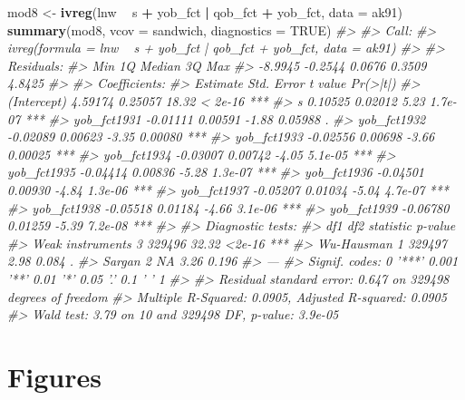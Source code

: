 \documentclass[]{book}
\newenvironment{Shaded}{\begin{snugshade}}{\end{snugshade}}
\newcommand{\KeywordTok}[1]{\textcolor[rgb]{0.13,0.29,0.53}{\textbf{#1}}}
\newcommand{\DataTypeTok}[1]{\textcolor[rgb]{0.13,0.29,0.53}{#1}}
\newcommand{\StringTok}[1]{\textcolor[rgb]{0.31,0.60,0.02}{#1}}
\newcommand{\CommentTok}[1]{\textcolor[rgb]{0.56,0.35,0.01}{\textit{#1}}}
\newcommand{\OtherTok}[1]{\textcolor[rgb]{0.56,0.35,0.01}{#1}}
\newcommand{\OperatorTok}[1]{\textcolor[rgb]{0.81,0.36,0.00}{\textbf{#1}}}
\newcommand{\NormalTok}[1]{#1}
\theoremstyle{definition}
\theoremstyle{definition}
\theoremstyle{definition}
\theoremstyle{remark}
\begin{document}
\begin{Shaded}
\begin{Highlighting}[]
\NormalTok{mod8 <-}\StringTok{ }\KeywordTok{ivreg}\NormalTok{(lnw }\OperatorTok{~}\StringTok{ }\NormalTok{s }\OperatorTok{+}\StringTok{ }\NormalTok{yob_fct }\OperatorTok{|}\StringTok{ }\NormalTok{qob_fct }\OperatorTok{+}\StringTok{ }\NormalTok{yob_fct, }\DataTypeTok{data =}\NormalTok{ ak91)}
\KeywordTok{summary}\NormalTok{(mod8, }\DataTypeTok{vcov =}\NormalTok{ sandwich, }\DataTypeTok{diagnostics =} \OtherTok{TRUE}\NormalTok{)}
\CommentTok{#> }
\CommentTok{#> Call:}
\CommentTok{#> ivreg(formula = lnw ~ s + yob_fct | qob_fct + yob_fct, data = ak91)}
\CommentTok{#> }
\CommentTok{#> Residuals:}
\CommentTok{#>     Min      1Q  Median      3Q     Max }
\CommentTok{#> -8.9945 -0.2544  0.0676  0.3509  4.8425 }
\CommentTok{#> }
\CommentTok{#> Coefficients:}
\CommentTok{#>             Estimate Std. Error t value Pr(>|t|)    }
\CommentTok{#> (Intercept)  4.59174    0.25057   18.32  < 2e-16 ***}
\CommentTok{#> s            0.10525    0.02012    5.23  1.7e-07 ***}
\CommentTok{#> yob_fct1931 -0.01111    0.00591   -1.88  0.05988 .  }
\CommentTok{#> yob_fct1932 -0.02089    0.00623   -3.35  0.00080 ***}
\CommentTok{#> yob_fct1933 -0.02556    0.00698   -3.66  0.00025 ***}
\CommentTok{#> yob_fct1934 -0.03007    0.00742   -4.05  5.1e-05 ***}
\CommentTok{#> yob_fct1935 -0.04414    0.00836   -5.28  1.3e-07 ***}
\CommentTok{#> yob_fct1936 -0.04501    0.00930   -4.84  1.3e-06 ***}
\CommentTok{#> yob_fct1937 -0.05207    0.01034   -5.04  4.7e-07 ***}
\CommentTok{#> yob_fct1938 -0.05518    0.01184   -4.66  3.1e-06 ***}
\CommentTok{#> yob_fct1939 -0.06780    0.01259   -5.39  7.2e-08 ***}
\CommentTok{#> }
\CommentTok{#> Diagnostic tests:}
\CommentTok{#>                     df1    df2 statistic p-value    }
\CommentTok{#> Weak instruments      3 329496     32.32  <2e-16 ***}
\CommentTok{#> Wu-Hausman            1 329497      2.98   0.084 .  }
\CommentTok{#> Sargan                2     NA      3.26   0.196    }
\CommentTok{#> ---}
\CommentTok{#> Signif. codes:  0 '***' 0.001 '**' 0.01 '*' 0.05 '.' 0.1 ' ' 1}
\CommentTok{#> }
\CommentTok{#> Residual standard error: 0.647 on 329498 degrees of freedom}
\CommentTok{#> Multiple R-Squared: 0.0905,  Adjusted R-squared: 0.0905 }
\CommentTok{#> Wald test: 3.79 on 10 and 329498 DF,  p-value: 3.9e-05}
\end{Highlighting}
\end{Shaded}

\section{Figures}\label{figures}
\end{document}
